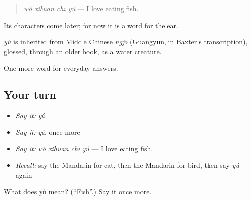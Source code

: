 \begin{quote}
\emph{wǒ xǐhuan chī yú} — I love eating fish.
\end{quote}

Its characters come later; for now it is a word for the ear.

\begin{cousinweb}
\emph{yú} is inherited from Middle Chinese \emph{ngjo} (Guangyun, in Baxter's transcription), glossed, through an older book, as a water creature.
\end{cousinweb}

\begin{grammarlens}[title={What you've built}]
One more word for everyday answers.
\end{grammarlens}

\subsection*{Your turn}
\begin{itemize}
\raggedright
  \item \emph{Say it:} \emph{yú}
  \item \emph{Say it:} \emph{yú}, once more
  \item \emph{Say it:} \emph{wǒ xǐhuan chī yú} — I love eating fish.
  \item \emph{Recall:} say the Mandarin for cat, then the Mandarin for bird, then say \emph{yú} again
\end{itemize}

\begin{tcolorbox}[breakable,colback=teal!4,colframe=teal!35!black,title={Before you move on}]
What does yú mean? (\textquotedblleft{}Fish\textquotedblright{}.) Say it once more.
\end{tcolorbox}
